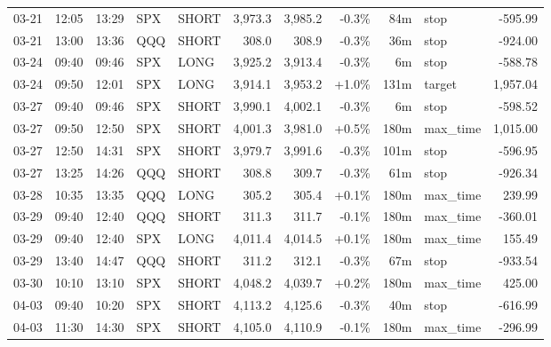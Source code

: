 \documentclass[11pt,a4paper,twoside]{article}
\begin{document}
\begin{center}
\begin{longtable}{>{\color{txtmain}}l l l l l r r r r >{\color{txtmain}}l r}
03-21 & 12:05 & 13:29 & SPX & SHORT & 3,973.3 & 3,985.2 & \textcolor{lossred}{-0.3\%} & 84m & stop & \textcolor{lossred}{-595.99} \\
03-21 & 13:00 & 13:36 & QQQ & SHORT & 308.0 & 308.9 & \textcolor{lossred}{-0.3\%} & 36m & stop & \textcolor{lossred}{-924.00} \\
03-24 & 09:40 & 09:46 & SPX & LONG & 3,925.2 & 3,913.4 & \textcolor{lossred}{-0.3\%} & 6m & stop & \textcolor{lossred}{-588.78} \\
03-24 & 09:50 & 12:01 & SPX & LONG & 3,914.1 & 3,953.2 & \textcolor{wingreen}{+1.0\%} & 131m & target & \textcolor{wingreen}{1,957.04} \\
03-27 & 09:40 & 09:46 & SPX & SHORT & 3,990.1 & 4,002.1 & \textcolor{lossred}{-0.3\%} & 6m & stop & \textcolor{lossred}{-598.52} \\
03-27 & 09:50 & 12:50 & SPX & SHORT & 4,001.3 & 3,981.0 & \textcolor{wingreen}{+0.5\%} & 180m & max\_time & \textcolor{wingreen}{1,015.00} \\
03-27 & 12:50 & 14:31 & SPX & SHORT & 3,979.7 & 3,991.6 & \textcolor{lossred}{-0.3\%} & 101m & stop & \textcolor{lossred}{-596.95} \\
03-27 & 13:25 & 14:26 & QQQ & SHORT & 308.8 & 309.7 & \textcolor{lossred}{-0.3\%} & 61m & stop & \textcolor{lossred}{-926.34} \\
03-28 & 10:35 & 13:35 & QQQ & LONG & 305.2 & 305.4 & \textcolor{wingreen}{+0.1\%} & 180m & max\_time & \textcolor{wingreen}{239.99} \\
03-29 & 09:40 & 12:40 & QQQ & SHORT & 311.3 & 311.7 & \textcolor{lossred}{-0.1\%} & 180m & max\_time & \textcolor{lossred}{-360.01} \\
03-29 & 09:40 & 12:40 & SPX & LONG & 4,011.4 & 4,014.5 & \textcolor{wingreen}{+0.1\%} & 180m & max\_time & \textcolor{wingreen}{155.49} \\
03-29 & 13:40 & 14:47 & QQQ & SHORT & 311.2 & 312.1 & \textcolor{lossred}{-0.3\%} & 67m & stop & \textcolor{lossred}{-933.54} \\
03-30 & 10:10 & 13:10 & SPX & SHORT & 4,048.2 & 4,039.7 & \textcolor{wingreen}{+0.2\%} & 180m & max\_time & \textcolor{wingreen}{425.00} \\
04-03 & 09:40 & 10:20 & SPX & SHORT & 4,113.2 & 4,125.6 & \textcolor{lossred}{-0.3\%} & 40m & stop & \textcolor{lossred}{-616.99} \\
04-03 & 11:30 & 14:30 & SPX & SHORT & 4,105.0 & 4,110.9 & \textcolor{lossred}{-0.1\%} & 180m & max\_time & \textcolor{lossred}{-296.99} \\

\end{longtable}
\end{center}
\end{document}
